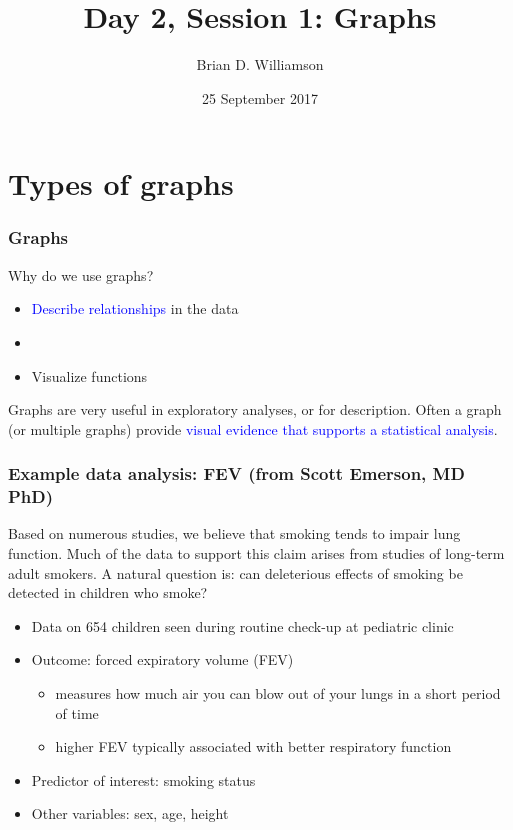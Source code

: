 \documentclass[11pt, hyperref={colorlinks, urlcolor=blue}]{beamer}
\title{Day 2, Session 1: Graphs}
\author{Brian D. Williamson}
\institute{EPI/BIOST Bootcamp 2017}
\date{25 September 2017}
\newcommand{\myframe}[1]{\begin{frame} \frametitle{#1}}
\newenvironment{spaceitemize}
{ \begin{itemize}
    \setlength{\itemsep}{10pt}
    \setlength{\parskip}{0pt}
    \setlength{\parsep}{0pt}     }
{ \end{itemize}                  }
\begin{document}
\begin{frame}
\titlepage
\end{frame}

\section{Types of graphs}
\myframe{Graphs}
Why do we use graphs?
\begin{itemize}
\item \textcolor{blue}{Describe relationships} in the data
\item[]
\item Visualize functions
\end{itemize}

Graphs are very useful in exploratory analyses, or for description. Often a graph (or multiple graphs) provide \textcolor{blue}{visual evidence that supports a statistical analysis}.

\end{frame}

\myframe{Example data analysis: FEV \small (from Scott Emerson, MD PhD)}
Based on numerous studies, we believe that smoking tends to impair lung function. Much of the data to support this claim arises from studies of long-term adult smokers. A natural question is: can deleterious effects of smoking be detected in children who smoke?
\begin{spaceitemize}
\item Data on 654 children seen during routine check-up at pediatric clinic
\item Outcome: forced expiratory volume (FEV)
\begin{itemize}
\item measures how much air you can blow out of your lungs in a short period of time
\item higher FEV typically associated with better respiratory function
\end{itemize}
\item Predictor of interest: smoking status
\item Other variables: sex, age, height
\end{spaceitemize}
\end{frame}
\end{document}
